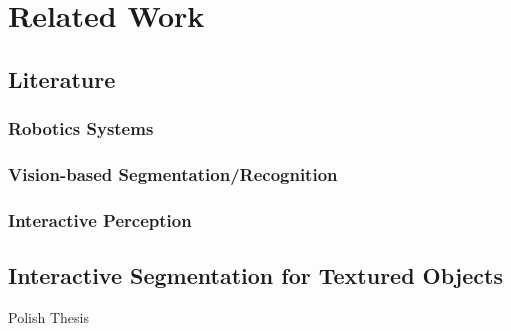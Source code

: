 \chapter{Related Work}
\label{chapter:Related Work}


\section{Literature}
\subsection{Robotics Systems}
\subsection{Vision-based Segmentation/Recognition}
\subsection{Interactive Perception}


\section{Interactive Segmentation for Textured Objects}
\item Polish Thesis